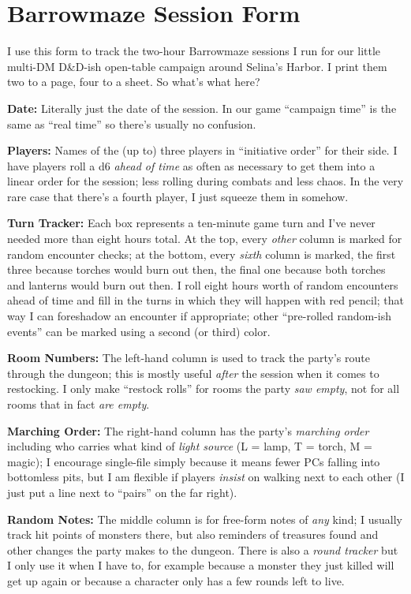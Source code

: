 
\section{Barrowmaze Session Form}

I use this form to track the two-hour Barrowmaze sessions I run for our little
multi-DM D\&D-ish open-table campaign around Selina's Harbor. I print them two
to a page, four to a sheet. So what's what here?

\textbf{Date:}
%
Literally just the date of the session.
%
In our game ``campaign time'' is the same as ``real time'' so there's usually
no confusion.

\textbf{Players:}
%
Names of the (up to) three players in ``initiative order'' for their side.
%
I have players roll a d6 \emph{ahead of time} as often as necessary to get them
into a linear order for the session; less rolling during combats and less chaos.
%
In the very rare case that there's a fourth player, I just squeeze them in
somehow.

\textbf{Turn Tracker:}
%
Each box represents a ten-minute game turn and I've never needed more than
eight hours total.
%
At the top, every \emph{other} column is marked \monster{} for random encounter
checks; at the bottom, every \emph{sixth} column is marked, the first three
\torch{} because torches would burn out then, the final one \lantern{} because
both torches and lanterns would burn out then.
%
I roll eight hours worth of random encounters ahead of time and fill in the
turns in which they will happen with red pencil; that way I can foreshadow an
encounter if appropriate; other ``pre-rolled random-ish events'' can be marked
using a second (or third) color.

\textbf{Room Numbers:}
%
The left-hand column is used to track the party's route through the dungeon;
this is mostly useful \emph{after} the session when it comes to restocking.
%
I only make ``restock rolls'' for rooms the party \emph{saw empty}, not for all
rooms that in fact \emph{are empty}.

\textbf{Marching Order:}
%
The right-hand column has the party's \emph{marching order} including who
carries what kind of \emph{light source} (L = lamp, T = torch, M = magic); I
encourage single-file simply because it means fewer PCs falling into bottomless
pits, but I am flexible if players \emph{insist} on walking next to each other
(I just put a line next to ``pairs'' on the far right).

\textbf{Random Notes:}
%
The middle column is for free-form notes of \emph{any} kind; I usually track
hit points of monsters there, but also reminders of treasures found and other
changes the party makes to the dungeon.
%
There is also a \emph{round tracker} but I only use it when I have to, for
example because a monster they just killed will get up again or because a
character only has a few rounds left to live.


